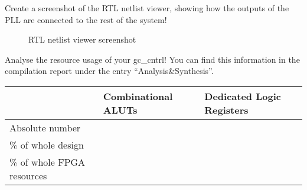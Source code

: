 \documentclass[10pt,a4paper,titlepage,oneside]{article}
\begin{document}
\maketitle



\begin{qa}{Create a screenshot of the RTL netlist viewer, showing how the outputs of the PLL are connected to the rest of the system!}
	\begin{figure}[h!]
		\centering
		\dummyimage
		\caption{RTL netlist viewer screenshot}
	\end{figure}
\end{qa}



\begin{qa}{Analyse the resource usage of your \textsf{gc\_cntrl}! You can find this information in the compilation report under the entry ``Analysis\&Synthesis''. }
\centering
\begin{tabular}{l|ll}
	\hline
		                   & Combinational ALUTs & Dedicated Logic Registers  \\ \hline\hline 
	Absolute number            &                     &                            \\
	\% of whole design         &                     &                            \\
	\% of whole FPGA resources &                     &                            \\ \hline
\end{tabular}
\end{qa}


\end{document}
